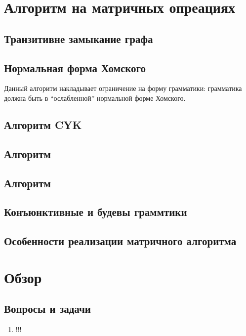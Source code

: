 \section{Алгоритм на матричных опреациях}

\subsection{Транзитивне замыкание графа}

\subsection{Нормальная форма Хомского}

Данный алгоритм накладывает ограничение на форму грамматики: грамматика должна быть в ``ослабленной'' нормальной форме Хомского.

\subsection{Алгоритм CYK}

\subsection{Алгоритм }

\subsection{Алгоритм}

\subsection{Конъюнктивные и будевы граммтики}

\subsection{Особенности реализации матричного алгоритма}

\section{Обзор}

\subsection{Вопросы и задачи}
\begin{enumerate}
  \item !!!
\end{enumerate}
